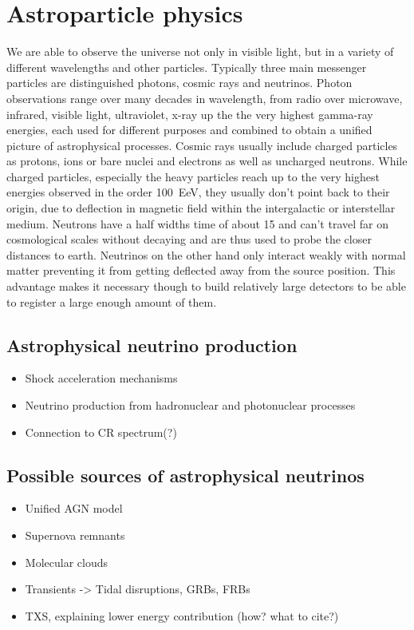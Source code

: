 \chapter{Astroparticle physics}

We are able to observe the universe not only in visible light, but in a variety of different wavelengths and other particles.
Typically three main messenger particles are distinguished photons, cosmic rays and neutrinos.
Photon observations range over many decades in wavelength, from radio over microwave, infrared, visible light, ultraviolet, x-ray up the the very highest gamma-ray energies, each used for different purposes and combined to obtain a unified picture of astrophysical processes.
Cosmic rays usually include charged particles as protons, ions or bare nuclei and electrons as well as uncharged neutrons.
While charged particles, especially the heavy particles reach up to the very highest energies observed in the order \SI{100}{\exa\eV}, they usually don't point back to their origin, due to deflection in magnetic field within the intergalactic or interstellar medium.
Neutrons have a half widths time of about \SI{15}{\min} and can't travel far on cosmological scales without decaying and are thus used to probe the closer distances to earth.
Neutrinos on the other hand only interact weakly with normal matter preventing it from getting deflected away from the source position.
This advantage makes it necessary though to build relatively large detectors to be able to register a large enough amount of them.

\section{Astrophysical neutrino production}
\begin{itemize}
  \item Shock acceleration mechanisms
  \item Neutrino production from hadronuclear and photonuclear processes
  \item Connection to CR spectrum(?)
\end{itemize}

\section{Possible sources of astrophysical neutrinos}
\begin{itemize}
  \item Unified AGN model
  \item Supernova remnants
  \item Molecular clouds
  \item Transients -> Tidal disruptions, GRBs, FRBs
  \item TXS, explaining lower energy contribution (how? what to cite?)
\end{itemize}